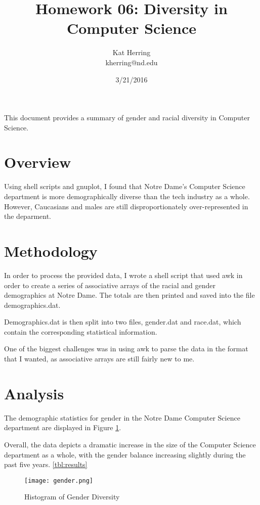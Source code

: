 \documentclass[letterpaper]{article}
\title{Homework 06: Diversity in Computer Science}
\date{3/21/2016}
\author{Kat Herring \\ kherring@nd.edu}
\begin{document}
\maketitle

This document provides a summary of gender and racial diversity in Computer Science.

\section{Overview}

Using shell scripts and gnuplot, I found that Notre Dame's Computer Science department is more demographically diverse than the tech industry as a whole. However, Caucasians and males are still disproportionately over-represented in the deparment.

\section{Methodology}

In order to process the provided data, I wrote a shell script that used awk in order to create a series of associative arrays of the racial and gender demographics at Notre Dame. The totals are then printed and saved into the file demographics.dat.

Demographics.dat is then split into two files, gender.dat and race.dat, which contain the corresponding statistical information.

One of the biggest challenges was in using awk to parse the data in the format that I wanted, as associative arrays are still fairly new to me.

\section{Analysis}

The demographic statistics for gender in the Notre Dame Computer Science department are displayed in Figure \ref{fig:gender}.

Overall, the data depicts a dramatic increase in the size of the Computer Science department as a whole, with the gender balance increasing slightly during the past five years. \ref{tbl:results}

\begin{figure}[h]
\centering
\texttt{[image: gender.png]}
\caption{Histogram of Gender Diversity}
\label{fig:gender}
\end{figure}
\end{document}
